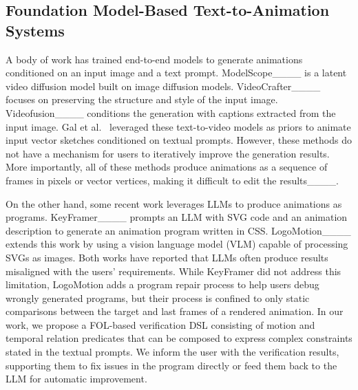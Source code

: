 \subsection{Foundation Model-Based Text-to-Animation Systems}
A body of work has trained end-to-end models to generate animations conditioned on an input image and a text prompt.
ModelScope____ is a latent video diffusion model built on image diffusion models.
VideoCrafter____ focuses on preserving the structure and style of the input image.
Videofusion____ conditions the generation with captions extracted from the input image.
Gal et al.~ leveraged these text-to-video models as priors to animate input vector sketches conditioned on textual prompts.
However, these methods do not have a mechanism for users to iteratively improve the generation results.
More importantly, all of these methods produce animations as a sequence of frames in pixels or vector vertices, making it difficult to edit the results____.

On the other hand, some recent work leverages LLMs to produce animations as programs.
KeyFramer____ prompts an LLM with SVG code and an animation description to generate an animation program written in CSS.
LogoMotion____ extends this work by using a vision language model (VLM) capable of processing SVGs as images.
%
Both works have reported that LLMs often produce results misaligned with the users' requirements.
While KeyFramer did not address this limitation, LogoMotion adds a program repair process to help users debug wrongly generated programs, but their process is confined to only static comparisons between the target and last frames of a rendered animation.
%
In our work, we propose a FOL-based verification DSL consisting of motion and temporal relation predicates that can be composed to express complex constraints stated in the textual prompts.
We inform the user with the verification results, supporting them to fix issues in the program directly or feed them back to the LLM for automatic improvement.


